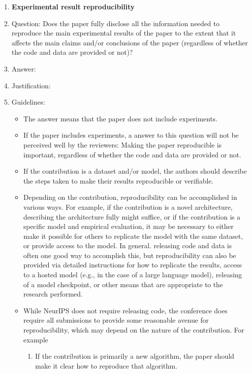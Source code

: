 \documentclass{article}
\theoremstyle{plain}
\theoremstyle{definition}
\theoremstyle{remark}
\begin{document}
\begin{enumerate}
    \item {\bf Experimental result reproducibility}
    \item[] Question: Does the paper fully disclose all the information needed to reproduce the main experimental results of the paper to the extent that it affects the main claims and/or conclusions of the paper (regardless of whether the code and data are provided or not)?
    \item[] Answer: \answerTODO{} %
    \item[] Justification: \justificationTODO{}
    \item[] Guidelines:
    \begin{itemize}
        \item The answer \answerNA{} means that the paper does not include experiments.
        \item If the paper includes experiments, a \answerNo{} answer to this question will not be perceived well by the reviewers: Making the paper reproducible is important, regardless of whether the code and data are provided or not.
        \item If the contribution is a dataset and\slash or model, the authors should describe the steps taken to make their results reproducible or verifiable. 
        \item Depending on the contribution, reproducibility can be accomplished in various ways. For example, if the contribution is a novel architecture, describing the architecture fully might suffice, or if the contribution is a specific model and empirical evaluation, it may be necessary to either make it possible for others to replicate the model with the same dataset, or provide access to the model. In general. releasing code and data is often one good way to accomplish this, but reproducibility can also be provided via detailed instructions for how to replicate the results, access to a hosted model (e.g., in the case of a large language model), releasing of a model checkpoint, or other means that are appropriate to the research performed.
        \item While NeurIPS does not require releasing code, the conference does require all submissions to provide some reasonable avenue for reproducibility, which may depend on the nature of the contribution. For example
        \begin{enumerate}
            \item If the contribution is primarily a new algorithm, the paper should make it clear how to reproduce that algorithm.

\end{enumerate}
\end{itemize}
\end{enumerate}
\end{document}
